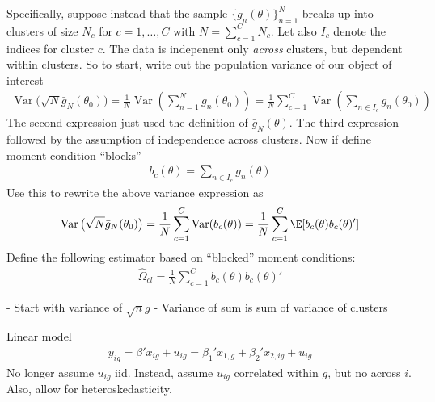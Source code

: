 \documentclass[12pt]{article}
\theoremstyle{plain}
\theoremstyle{definition}
\theoremstyle{remark}
\newcommand{\Var}{\operatorname{Var}}
\newcommand{\sumnN}{\sum^N_{n=1}}
\newcommand{\nN}{_{n=1}^N}
\begin{document}
Specifically, suppose instead that the sample $\{g_n(\theta)\}\nN$
breaks up into clusters of size $N_c$ for $c=1,\ldots,C$ with
$N=\sum_{c=1}^CN_c$.
Let also $I_c$ denote the indices for cluster $c$.
The data is indepenent only \emph{across} clusters, but dependent within
clusters.
So to start, write out the population variance of our object of interest
\begin{align*}
  \Var\big(\sqrt{N}\bar{g}_N(\theta_0)\big)
  =
  \frac{1}{N}
  \Var\left(
    \sumnN
    g_n(\theta_0)
  \right)
  =
  \frac{1}{N}
  \sum_{c=1}^C
  \Var\left(
    \sum_{n\in I_c}
    g_n(\theta_0)
  \right)
\end{align*}
The second expression just used the definition of $\bar{g}_N(\theta)$.
The third expression followed by the assumption of independence across
clusters. Now if define moment condition ``blocks''
\begin{align*}
  b_c(\theta)
  =
  \sum_{n\in I_c}
  g_n(\theta)
\end{align*}
Use this to rewrite the above variance expression as
\begin{align*}
  \Var\big(\sqrt{N}\bar{g}_N(\theta_0)\big)
  =
  \frac{1}{N}
  \sum_{c=1}^C
  \Var(b_c(\theta))
  =
  \frac{1}{N}
  \sum_{c=1}^C
  \E[b_c(\theta)b_c(\theta)']
\end{align*}
Define the following estimator based on ``blocked'' moment conditions:
\begin{align*}
  \hat{\Omega}_{cl}
  =
  \frac{1}{N}
  \sum_{c=1}^C
  b_c(\theta)b_c(\theta)'
\end{align*}



- Start with variance of $\sqrt{n}\bar{g}$
- Variance of sum is sum of variance of clusters

\clearpage
Linear model
\begin{align*}
  y_{ig}
  =
  \beta'x_{ig} + u_{ig}
  =
  \beta_1'x_{1,g} + \beta_2'x_{2,ig} + u_{ig}
\end{align*}
No longer assume $u_{ig}$ iid.
Instead, assume $u_{ig}$ correlated within $g$, but no across $i$.
Also, allow for heteroskedasticity.
\end{document}
